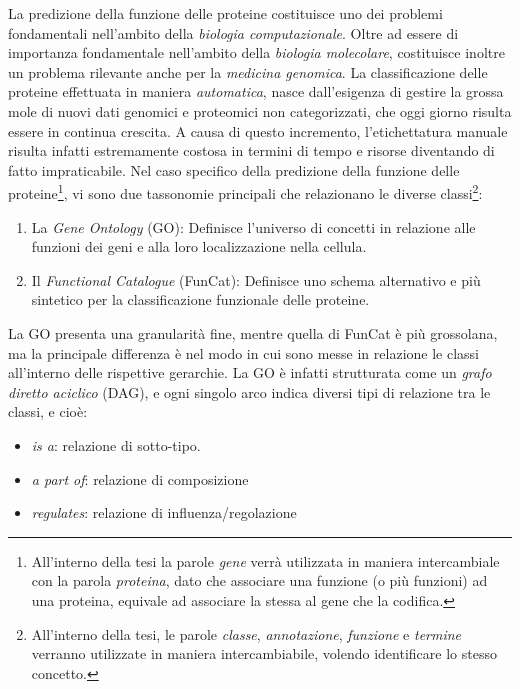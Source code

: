 \documentclass[12pt]{report}
\begin{document}
La predizione della funzione delle proteine costituisce uno dei problemi fondamentali nell'ambito della \emph{biologia computazionale}\cite{JIANG}. Oltre ad essere di importanza fondamentale nell'ambito della \emph{biologia molecolare}, costituisce inoltre un  problema rilevante anche per la \emph{medicina genomica}\cite{LEUNG}.
\newline
\newline
La classificazione delle proteine effettuata in maniera \emph{automatica}\cite{gfp}, nasce dall'esigenza di gestire la grossa mole di nuovi dati genomici e proteomici non categorizzati, che oggi giorno risulta essere in continua crescita. A causa di questo incremento, l'etichettatura manuale  risulta infatti estremamente costosa in termini di tempo e risorse diventando di fatto impraticabile.
\newline
\newline
Nel caso specifico della predizione della funzione delle proteine\footnote{\footnotesize{All'interno della tesi la parole \emph{gene} verrà utilizzata in maniera intercambiale con la parola \emph{proteina}, dato che associare una funzione (o più funzioni) ad una proteina, equivale ad associare la stessa al gene che la codifica.}}, vi sono due tassonomie principali che relazionano le diverse classi\footnote{\footnotesize{All'interno della tesi, le parole \emph{classe}, \emph{annotazione}, \emph{funzione} e \emph{termine} verranno utilizzate in maniera intercambiabile, volendo identificare lo stesso concetto.}}:

\begin{enumerate}
\item La \emph{Gene Ontology} (GO)\cite{go}: Definisce l'universo di concetti in relazione alle funzioni dei geni e alla loro localizzazione nella cellula.
\item Il \emph{Functional Catalogue} (FunCat)\cite{FunCat}: Definisce uno schema alternativo e più sintetico per la classificazione funzionale delle proteine.
\end{enumerate}

La GO presenta una granularità fine, mentre quella di FunCat è più grossolana, ma la principale differenza è nel modo in cui sono messe in relazione le classi all'interno delle rispettive gerarchie. La GO è infatti strutturata come un \emph{grafo diretto aciclico} (DAG), e ogni singolo arco indica diversi tipi di relazione tra le classi\cite{GO:REL}, e cioè:
\begin{itemize}
\item\emph{is a}: relazione di sotto-tipo.
\item \emph{a part of}: relazione di composizione
\item \emph{regulates}: relazione di influenza/regolazione
\end{itemize} 
\end{document}
